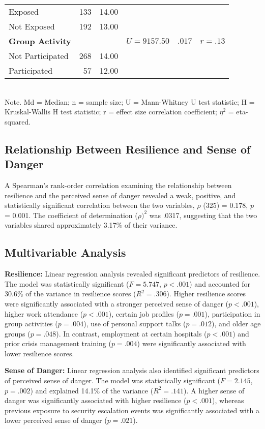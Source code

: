 \documentclass[12pt]{article}
\begin{document}
\begin{table}[h!]
\begin{tabular}{l r r r r r}
\quad Exposed & 133 & 14.00 & & & \\
\quad Not Exposed & 192 & 13.00 & & & \\
\midrule
\textbf{Group Activity} & & & $U = 9157.50$ & $.017$ & $r = .13$ \\
\quad Not Participated & 268 & 14.00 & & & \\
\quad Participated & 57 & 12.00 & & & \\
\bottomrule
\end{tabular}
\\
\smallskip
\footnotesize Note. Md = Median; n = sample size; U = Mann-Whitney U test statistic; H = Kruskal-Wallis H test statistic; r = effect size correlation coefficient; $\eta^2$ = eta-squared.
\end{table}

\subsection{Relationship Between Resilience and Sense of Danger}
A Spearman's rank-order correlation examining the relationship between resilience and the perceived sense of danger revealed a weak, positive, and statistically significant correlation between the two variables, $\rho$ (325) = 0.178, $p$ = 0.001. The coefficient of determination ($\rho)^2$ was .0317, suggesting that the two variables shared approximately 3.17\% of their variance.

\subsection{Multivariable Analysis}
\textbf{Resilience:} Linear regression analysis revealed significant predictors of resilience. The model was statistically significant ($F = 5.747$, $p < .001$) and accounted for 30.6\% of the variance in resilience scores ($R^2 = .306$). Higher resilience scores were significantly associated with a stronger perceived sense of danger ($p < .001$), higher work attendance ($p < .001$), certain job profiles ($p = .001$), participation in group activities ($p = .004$), use of personal support talks ($p = .012$), and older age groups ($p = .048$). In contrast, employment at certain hospitals ($p < .001$) and prior crisis management training ($p = .004$) were significantly associated with lower resilience scores.

\textbf{Sense of Danger:} Linear regression analysis also identified significant predictors of perceived sense of danger. The model was statistically significant ($F = 2.145$, $p = .002$) and explained 14.1\% of the variance ($R^2 = .141$). A higher sense of danger was significantly associated with higher resilience ($p < .001$), whereas previous exposure to security escalation events was significantly associated with a lower perceived sense of danger ($p = .021$).
\end{document}
